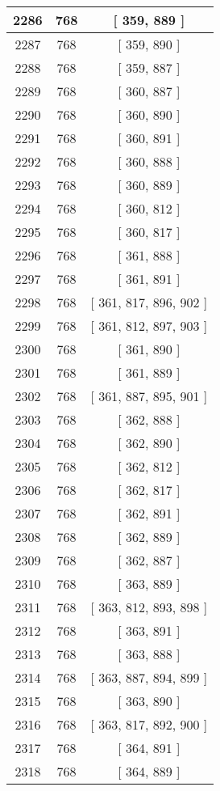 \begin{center}
\begin{longtable}[H]{|| c c c ||}
\hline
2286 & 768 & [ 359, 889 ] \\ 
\hline
2287 & 768 & [ 359, 890 ] \\ 
\hline
2288 & 768 & [ 359, 887 ] \\ 
\hline
2289 & 768 & [ 360, 887 ] \\ 
\hline
2290 & 768 & [ 360, 890 ] \\ 
\hline
2291 & 768 & [ 360, 891 ] \\ 
\hline
2292 & 768 & [ 360, 888 ] \\ 
\hline
2293 & 768 & [ 360, 889 ] \\ 
\hline
2294 & 768 & [ 360, 812 ] \\ 
\hline
2295 & 768 & [ 360, 817 ] \\ 
\hline
2296 & 768 & [ 361, 888 ] \\ 
\hline
2297 & 768 & [ 361, 891 ] \\ 
\hline
2298 & 768 & [ 361, 817, 896, 902 ] \\ 
\hline
2299 & 768 & [ 361, 812, 897, 903 ] \\ 
\hline
2300 & 768 & [ 361, 890 ] \\ 
\hline
2301 & 768 & [ 361, 889 ] \\ 
\hline
2302 & 768 & [ 361, 887, 895, 901 ] \\ 
\hline
2303 & 768 & [ 362, 888 ] \\ 
\hline
2304 & 768 & [ 362, 890 ] \\ 
\hline
2305 & 768 & [ 362, 812 ] \\ 
\hline
2306 & 768 & [ 362, 817 ] \\ 
\hline
2307 & 768 & [ 362, 891 ] \\ 
\hline
2308 & 768 & [ 362, 889 ] \\ 
\hline
2309 & 768 & [ 362, 887 ] \\ 
\hline
2310 & 768 & [ 363, 889 ] \\ 
\hline
2311 & 768 & [ 363, 812, 893, 898 ] \\ 
\hline
2312 & 768 & [ 363, 891 ] \\ 
\hline
2313 & 768 & [ 363, 888 ] \\ 
\hline
2314 & 768 & [ 363, 887, 894, 899 ] \\ 
\hline
2315 & 768 & [ 363, 890 ] \\ 
\hline
2316 & 768 & [ 363, 817, 892, 900 ] \\ 
\hline
2317 & 768 & [ 364, 891 ] \\ 
\hline
2318 & 768 & [ 364, 889 ] \\ 

\end{longtable}
\end{center}
